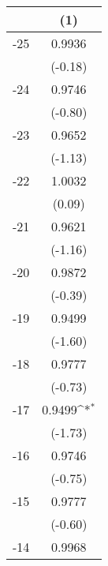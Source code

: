 {
\def\sym#1{\ifmmode^{#1}\else\(^{#1}\)\fi}
\begin{tabular}{l*{1}{c}}
\hline\hline
                                   &\multicolumn{1}{c}{(1)}         \\
\hline
  -25                              &      0.9936         \\
                                   &     (-0.18)         \\
[1em]
  -24                              &      0.9746         \\
                                   &     (-0.80)         \\
[1em]
  -23                              &      0.9652         \\
                                   &     (-1.13)         \\
[1em]
  -22                              &      1.0032         \\
                                   &      (0.09)         \\
[1em]
  -21                              &      0.9621         \\
                                   &     (-1.16)         \\
[1em]
  -20                              &      0.9872         \\
                                   &     (-0.39)         \\
[1em]
  -19                              &      0.9499         \\
                                   &     (-1.60)         \\
[1em]
  -18                              &      0.9777         \\
                                   &     (-0.73)         \\
[1em]
  -17                              &      0.9499\sym{*}  \\
                                   &     (-1.73)         \\
[1em]
  -16                              &      0.9746         \\
                                   &     (-0.75)         \\
[1em]
  -15                              &      0.9777         \\
                                   &     (-0.60)         \\
[1em]
  -14                              &      0.9968         \\

\end{tabular}}
